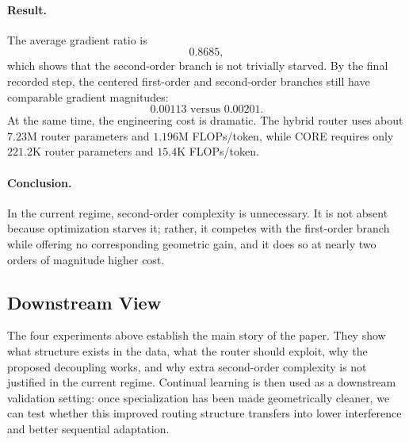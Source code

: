 \paragraph{Result.}
The average gradient ratio is
$$
0.8685,
$$
which shows that the second-order branch is not trivially starved. By the final recorded step, the centered first-order and second-order branches still have comparable gradient magnitudes:
$$
0.00113 \text{ versus } 0.00201.
$$
At the same time, the engineering cost is dramatic. The hybrid router uses about $7.23$M router parameters and $1.196$M FLOPs/token, while CORE requires only $221.2$K router parameters and $15.4$K FLOPs/token.

\paragraph{Conclusion.}
In the current regime, second-order complexity is unnecessary. It is not absent because optimization starves it; rather, it competes with the first-order branch while offering no corresponding geometric gain, and it does so at nearly two orders of magnitude higher cost.

\subsection{Downstream View}
The four experiments above establish the main story of the paper. They show what structure exists in the data, what the router should exploit, why the proposed decoupling works, and why extra second-order complexity is not justified in the current regime. Continual learning is then used as a downstream validation setting: once specialization has been made geometrically cleaner, we can test whether this improved routing structure transfers into lower interference and better sequential adaptation.
